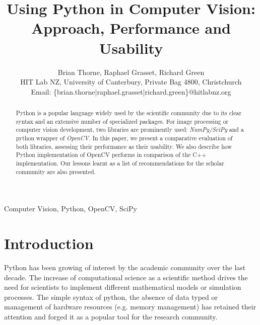 \documentclass[english]{IEEEtran}
\theoremstyle{plain}
\begin{document}
\title{Using Python in Computer Vision: Approach, Performance and Usability}

\author{Brian Thorne, Raphael Grasset, Richard Green\\
HIT Lab NZ, University of Canterbury, Private Bag 4800, Christchurch\\
Email: \{brian.thorne|raphael.grasset|richard.green\}@hitlabnz.org}
\maketitle


\begin{abstract}
Python is a popular language widely used by the scientific community due
to its clear syntax and an extensive number of specialized packages. For image 
processing or computer vision development, two libraries are prominently used:
\textit{NumPy/SciPy} and a python wrapper of \textit{OpenCV}. In this paper, we present a comparative 
evaluation of both libraries, assessing their performance as their usability. We also 
describe how Python implementation of OpenCV performs in comparison of the C++ implementation.
Our lessons learnt as a list of recommendations for the scholar community are also presented.
\end{abstract}

\begin{keywords}
Computer Vision, Python, OpenCV, SciPy
\end{keywords}

\section{Introduction}

Python \cite{} has been growing of interest by the academic community over the last decade.
The increase of computational science as a scientific method drives the need for scientists
to implement different mathematical models or simulation processes. The simple syntax of python, the absence
of data typed or management of hardware resources (e.g. memory management) has retained their attention
and forged it as a popular tool for the research community.
\end{document}
